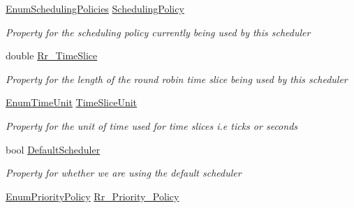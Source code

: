 \begin{DoxyCompactItemize}
\hyperlink{namespace_c_p_u___o_s___simulator_1_1_operating___system_ad0cdaacf9652394d23fa29109640fe08}{Enum\+Scheduling\+Policies} \hyperlink{class_c_p_u___o_s___simulator_1_1_operating___system_1_1_scheduler_afbf291846705747709c32eb79f1106b4}{Scheduling\+Policy}
\begin{DoxyCompactList}\small\item\em Property for the scheduling policy currently being used by this scheduler \end{DoxyCompactList}\item 
double \hyperlink{class_c_p_u___o_s___simulator_1_1_operating___system_1_1_scheduler_ab21e8ffe8d0f06388cc2310d3dbb3b48}{Rr\+\_\+\+Time\+Slice}
\begin{DoxyCompactList}\small\item\em Property for the length of the round robin time slice being used by this scheduler \end{DoxyCompactList}\item 
\hyperlink{namespace_c_p_u___o_s___simulator_1_1_operating___system_a0553d0bc2513aec52caa769acf994d5c}{Enum\+Time\+Unit} \hyperlink{class_c_p_u___o_s___simulator_1_1_operating___system_1_1_scheduler_aaf31b58cc7c6e632c0ce7ca34612e1ba}{Time\+Slice\+Unit}
\begin{DoxyCompactList}\small\item\em Property for the unit of time used for time slices i.\+e ticks or seconds \end{DoxyCompactList}\item 
bool \hyperlink{class_c_p_u___o_s___simulator_1_1_operating___system_1_1_scheduler_acef6087d200a91657055a533ac0e3474}{Default\+Scheduler}
\begin{DoxyCompactList}\small\item\em Property for whether we are using the default scheduler \end{DoxyCompactList}\item 
\hyperlink{namespace_c_p_u___o_s___simulator_1_1_operating___system_a3a9286a473bd079e9c65908c0378fa00}{Enum\+Priority\+Policy} \hyperlink{class_c_p_u___o_s___simulator_1_1_operating___system_1_1_scheduler_aadb6b79c667cfd6baef113c44fb98f9e}{Rr\+\_\+\+Priority\+\_\+\+Policy}

\end{DoxyCompactItemize}
